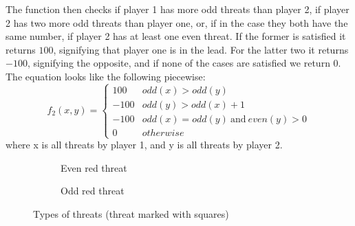 \documentclass{article}
\newcommand{\rd}{\node [player, fill=red]{};}
\newcommand{\yw}{\node [player, fill=yellow] {};}
\newcommand{\gy}{\node [player, fill=white] {};}
\newcommand{\rt}{\node [threat, fill=red!50] {};}
\begin{document}
The function then checks if player 1 has more odd threats than player 2, if player 2 has two more odd threats than player one, or, if in the case they both have the same number, if player 2 has at least one even threat. If the former is satisfied it returns $100$, signifying that player one is in the lead. For the latter two it returns $-100$, signifying the opposite, and if none of the cases are satisfied we return 0. The equation looks like the following piecewise:
\[ f_2(x,y)=\begin{cases} 
	100 & odd(x)>odd(y) \\
	-100 & odd(y)>odd(x)+1 \\
	-100 & odd(x)=odd(y)~\mbox{and}~even(y) > 0\\
	0 & otherwise
	\end{cases}
\]
where x is all threats by player 1, and y is all threats by player 2.
		
\begin{figure}[t]
	\centering
	\begin{subfigure}[b]{0.4\textwidth}
		\centering
		\caption{Even red threat}
		\label{threatodd}
	\end{subfigure}%
	\begin{subfigure}[b]{0.4\textwidth}
		\centering
		\caption{Odd red threat}
		\label{threateven}
	\end{subfigure}%
	\caption{Types of threats (threat marked with squares)}
	\label{threattypes}
\end{figure}
\end{document}
